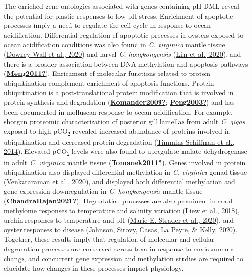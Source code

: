 \documentclass [11pt, proquest] {uwthesis}[2015/03/03]
\begin{document}
The enriched gene ontologies associated with genes containing pH-DML reveal the potential for plastic responses to low pH stress. Enrichment of apoptotic processes imply a need to regulate the cell cycle in response to ocean acidification. Differential regulation of apoptotic processes in oysters exposed to ocean acidification conditions was also found in \emph{C. virginica} mantle tissue (\protect\hyperlink{ref-Downey-Wall2020}{Downey-Wall et al., 2020}) and larval \emph{C. hongkongensis} (\protect\hyperlink{ref-Lim2020}{Lim et al., 2020}), and there is a broader association between DNA methylation and apoptosis pathways (\protect\hyperlink{ref-Meng2011}{\textbf{Meng2011?}}). Enrichment of molecular functions related to protein ubiquitination complement enrichment of apoptosis functions. Protein ubiquitination is a post-translational protein modification that is involved in protein synthesis and degradation (\protect\hyperlink{ref-Komander2009}{\textbf{Komander2009?}}; \protect\hyperlink{ref-Peng2003}{\textbf{Peng2003?}}) and has been documented in molluscan response to ocean acidification. For example, shotgun proteomic characterization of posterior gill lamellae from adult \emph{C. gigas} exposed to high pCO\textsubscript{2} revealed increased abundance of proteins involved in ubiquitination and decreased protein degradation (\protect\hyperlink{ref-Timmins-Schiffman2014}{Timmins-Schiffman et al., 2014}). Elevated pCO\textsubscript{2} levels were also found to upregulate malate dehydrogenase in adult \emph{C. virginica} mantle tissue (\protect\hyperlink{ref-Tomanek2011}{\textbf{Tomanek2011?}}). Genes involved in protein ubiquitination also displayed differential methylation in \emph{C. virginica} gonad tissue (\protect\hyperlink{ref-Venkataraman2020}{Venkataraman et al., 2020}), and displayed both differential methylation and gene expression downregulation in \emph{C. hongkongensis} mantle tissue (\protect\hyperlink{ref-ChandraRajan2021}{\textbf{ChandraRajan2021?}}). Degradation processes are also prominent in coral methylome responses to temperature and salinity variation (\protect\hyperlink{ref-Liew2018}{Liew et al., 2018}), urchin responses to temperature and pH (\protect\hyperlink{ref-Strader2020}{Marie E. Strader et al., 2020}), and oyster responses to disease (\protect\hyperlink{ref-Johnson2020}{Johnson, Sirovy, Casas, La Peyre, \& Kelly, 2020}). Together, these results imply that regulation of molecular and cellular degradation processes are conserved across taxa in response to environmental change, and concurrent gene expression and methylation studies are required to elucidate how changes in these processes impact physiology.
\end{document}
